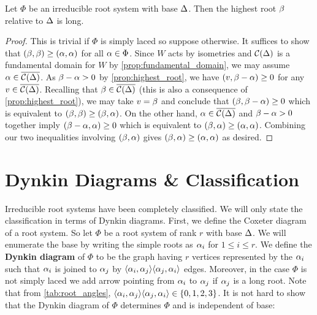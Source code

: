 \documentclass[12pt,reqno,oneside]{amsart}
\begin{document}
    \begin{proposition}
        Let $\Phi$ be an irreducible root system with base $\Delta$. Then the highest root $\beta$ relative to $\Delta$ is long.
    \end{proposition}
    \begin{proof}
        This is trivial if $\Phi$ is simply laced so suppose otherwise. It suffices to show that $(\beta,\beta)\ge (\alpha,\alpha)$ for all $\alpha \in \Phi$. Since $W$ acts by isometries and $\mathcal{C}(\Delta)$ is a fundamental domain for $W$ by \cref{prop:fundamental_domain}, we may assume $\alpha \in \overline{\mathcal{C}(\Delta)}$. As $\beta-\alpha > 0$ by \cref{prop:highest_root}, we have $(v,\beta-\alpha) \ge 0$ for any $v \in \overline{\mathcal{C}(\Delta)}$. Recalling that $\beta \in \overline{\mathcal{C}(\Delta)}$ (this is also a consequence of \cref{prop:highest_root}), we may take $v = \beta$ and conclude that $(\beta,\beta-\alpha) \ge 0$ which is equivalent to $(\beta,\beta) \ge (\beta,\alpha)$. On the other hand, $\alpha \in \overline{\mathcal{C}(\Delta)}$ and $\beta-\alpha > 0$ together imply $(\beta-\alpha,\alpha) \ge 0$ which is equivalent to $(\beta,\alpha) \ge (\alpha,\alpha)$. Combining our two inequalities involving $(\beta,\alpha)$ gives $(\beta,\alpha) \ge (\alpha,\alpha)$ as desired.
    \end{proof}
\section{Dynkin Diagrams \& Classification}
    Irreducible root systems have been completely classified. We will only state the classification in terms of Dynkin diagrams. First, we define the Coxeter diagram of a root system. So let $\Phi$ be a root system of rank $r$ with base $\Delta$. We will enumerate the base by writing the simple roots as $\alpha_{i}$ for $1 \le i \le r$. We define the \textbf{Dynkin diagram} of $\Phi$ to be the graph having $r$ vertices represented by the $\alpha_{i}$ such that $\alpha_{i}$ is joined to $\alpha_{j}$ by $\langle\alpha_{i},\alpha_{j}\rangle\langle\alpha_{j},\alpha_{i}\rangle$ edges. Moreover, in the case $\Phi$ is not simply laced we add arrow pointing from $\alpha_{i}$ to $\alpha_{j}$ if $\alpha_{j}$ is a long root. Note that from \cref{tab:root_angles}, $\langle\alpha_{i},\alpha_{j}\rangle\langle\alpha_{j},\alpha_{i}\rangle \in \{0,1,2,3\}$. It is not hard to show that the Dynkin diagram of $\Phi$ determines $\Phi$ and is independent of base:
\end{document}
